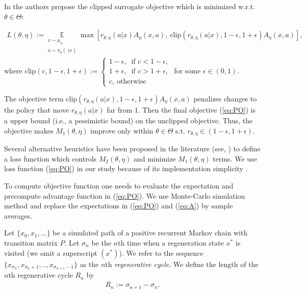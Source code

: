 \documentclass[11pt]{article}
\newcommand{\E}{\mathbb{E}}
\theoremstyle{definition}
\numberwithin{equation}{section}
\begin{document}
In \cite{Schulman2017} the authors propose the clipped surrogate objective which is minimized  w.r.t. $\theta\in \Theta$:

\begin{align}\label{eq:PO}
L(\theta, \eta):=\underset{\substack{ x\sim \mu_{\eta}\\ a\sim \pi_{\eta}(\cdot|x)  }  }{\E}   \max \left[  r_{\theta, \eta}(a|x) A_{\eta} (x, a) ,  ~ \text{clip} (r_{\theta, \eta}(a|x),  1-\epsilon, 1+\epsilon)  A_{\eta} (x, a)  \right],
\end{align}
where $\text{clip}(c,  1-\epsilon, 1+\epsilon):= \begin{cases} 1-\epsilon,~\text{ if } c<1-\epsilon,\\   1+\epsilon,~\text{ if } c>1+\epsilon,\\ c, ~\text{otherwise}\end{cases}$ for some $\epsilon\in(0, 1).$

The objective term $\text{clip} (r_{\theta, \eta}(a|x),  1-\epsilon, 1+\epsilon)  A_{\eta} (x, a) $ penalizes changes to the policy that move $ r_{\theta, \eta}(a|x) $ far  from 1. Then the final objective (\ref{eq:PO}) is   a upper bound (i.e., a pessimistic bound)   on the unclipped objective.   Thus, the objective makes $M_1(\theta, \eta)$ improve only within $\theta\in \Theta$  s.t. $r_{\theta, \eta}\in (1-\epsilon, 1+\epsilon)$.

Several alternative heuristics  have been proposed  in the literature (see, \cite{Schulman2015, Wang2016a, Schulman2017, Wu2017}) to define a loss function which controls $M_2(\theta, \eta)$ and minimize $M_1(\theta, \eta)$ terms. We use loss function (\ref{eq:PO}) in our study because of its implementation simplicity \cite{Schulman2017}.


To compute objective function one needs to evaluate the expectation and precompute advantage function in (\ref{eq:PO}). We  use Monte-Carlo simulation method and replace the expectations in (\ref{eq:PO}) and (\ref{eq:A}) by sample averages. 

Let $\{ x_0, x_1, ... \}$ be a simulated path of a positive recurrent Markov chain with  transition matrix $P$.  Let $\sigma_n$ be the $n$th time when a regeneration state $x^*$ is visited (we omit a superscript $(x^*)$). We refer to the sequence $\{ x_{\sigma_n}, x_{\sigma_n+1}, ..,  x_{\sigma_{n+1}-1}   \}$ as the $n$th \textit{regenerative cycle}. We define the length of the  $n$th regenerative cycle $R_n$ by 
\begin{align*}
R_n := \sigma_{n+1} - \sigma_{n}.
\end{align*}
\end{document}
